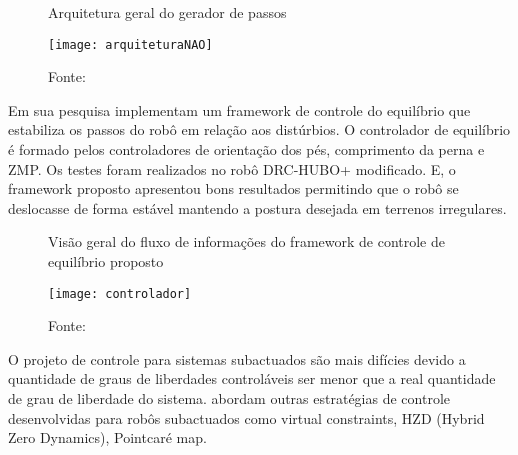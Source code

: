 \begin{figure} [H]
    \centering
    \caption{Arquitetura geral do gerador de passos}
    \texttt{[image: arquiteturaNAO]}
    \caption*{Fonte: \cite{Kasaei2018743}}
    \label{fig:arquitetura-nao}
\end{figure}

Em sua pesquisa  implementam um framework de controle do equilíbrio que estabiliza os passos do robô em relação aos distúrbios. O controlador de equilíbrio é formado pelos controladores de orientação dos pés, comprimento da perna e ZMP. Os testes foram realizados no robô DRC-HUBO+ modificado. E, o framework proposto apresentou bons resultados permitindo que o robô se deslocasse de forma estável mantendo a postura desejada em terrenos irregulares.


\begin{figure} [H]
    \centering
    \caption{Visão geral do fluxo de informações do framework de controle de equilíbrio proposto}
    \texttt{[image: controlador]}
    \caption*{Fonte: \cite{Joe2019}}
    \label{fig:framework-control}
\end{figure}


O projeto de controle para sistemas subactuados são mais difícies devido a quantidade de graus de liberdades controláveis ser menor que a real quantidade de grau de liberdade do sistema.  abordam outras estratégias de controle desenvolvidas para robôs subactuados como virtual constraints, HZD (Hybrid Zero Dynamics), Pointcaré map.
















